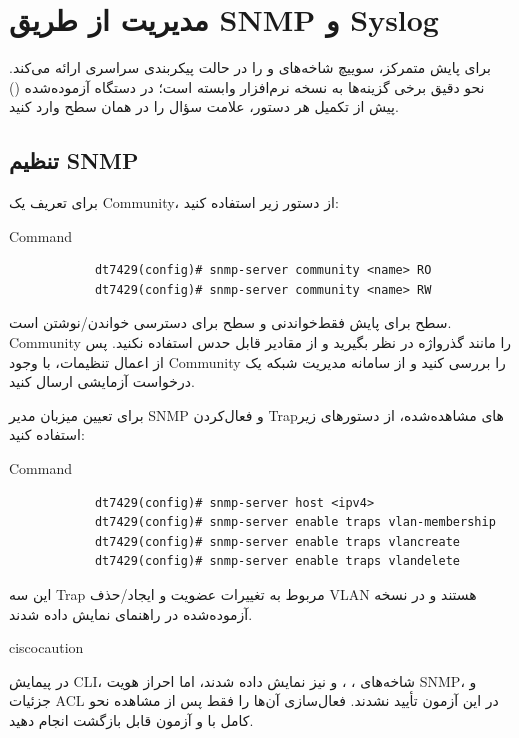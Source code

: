 \documentclass[11pt,letterpaper]{report}
\newenvironment{cautionbox}[1]{%
	\begin{noticebox}[title={\textbf{\faExclamationTriangle\ #1}}]{ciscocaution}
	}{%
	\end{noticebox}
}
\begin{document}
	\section{مدیریت از طریق SNMP و Syslog}
	برای پایش متمرکز، سوییچ شاخه‌های  و  را در
	حالت پیکربندی سراسری ارائه می‌کند. نحو دقیق برخی گزینه‌ها به نسخه
	نرم‌افزار وابسته است؛ در دستگاه آزموده‌شده () پیش از تکمیل هر دستور، علامت سؤال را در همان سطح وارد کنید.

	\subsection{تنظیم SNMP}
	برای تعریف یک Community، از دستور زیر استفاده کنید:
	\begin{LTR}
		\begin{cliexample}{Command}
			\begin{verbatim}
			dt7429(config)# snmp-server community <name> RO
			dt7429(config)# snmp-server community <name> RW
			\end{verbatim}
		\end{cliexample}
	\end{LTR}
	سطح  برای پایش فقط‌خواندنی و سطح  برای دسترسی
	خواندن/نوشتن است. Community را مانند گذرواژه در نظر بگیرید و از
	مقادیر قابل حدس استفاده نکنید. پس از اعمال تنظیمات، با
	 وجود Community را بررسی کنید و از سامانه
	مدیریت شبکه یک درخواست آزمایشی  ارسال کنید.

	برای تعیین میزبان مدیر SNMP و فعال‌کردن Trapهای مشاهده‌شده، از
	دستورهای زیر استفاده کنید:
	\begin{LTR}
		\begin{cliexample}{Command}
			\begin{verbatim}
			dt7429(config)# snmp-server host <ipv4>
			dt7429(config)# snmp-server enable traps vlan-membership
			dt7429(config)# snmp-server enable traps vlancreate
			dt7429(config)# snmp-server enable traps vlandelete
			\end{verbatim}
		\end{cliexample}
	\end{LTR}
	این سه Trap مربوط به تغییرات عضویت و ایجاد/حذف VLAN هستند و در
	نسخه آزموده‌شده در راهنمای  نمایش داده شدند.

	\begin{cautionbox}{محدودیت نسخه}
		در پیمایش CLI، شاخه‌های ، ،
		 و  نیز نمایش داده شدند، اما
		احراز هویت SNMP، ‏ و جزئیات ACL در این آزمون تأیید
		نشدند. فعال‌سازی آن‌ها را فقط پس از مشاهده نحو کامل با
		 و آزمون قابل بازگشت انجام دهید.
	\end{cautionbox}
\end{document}
